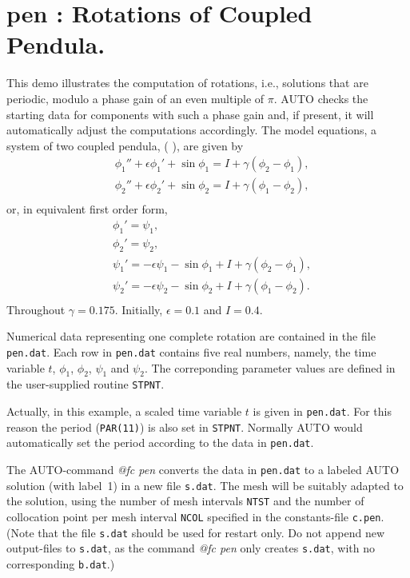 \documentclass[12pt]{report}
\def\eps{\epsilon}
\begin{document}
\section{ pen : Rotations of Coupled Pendula.} \label{sec:Demos_pen}
This demo illustrates the computation of rotations, i.e., solutions that
are periodic, modulo a phase gain of an even multiple of $\pi$.
{\cal AUTO} checks the starting data for components with such a phase gain
and, if present, it will automatically adjust the computations accordingly.
The model equations, a system of two coupled  pendula, 
( \citeyear{DoArOt:91}),
are given by
\begin{equation} \begin{array}{cl}
 & \phi_1'' + \eps \phi_1' + \sin \phi_1 
  = I + \gamma(\phi_2-\phi_1), \\
 & \phi_2'' + \eps \phi_2' + \sin \phi_2 
  = I + \gamma(\phi_1-\phi_2) ,\\
\end{array} \end{equation}
or, in equivalent first order form,
\begin{equation} \begin{array}{cl}
 & \phi_1'  =  \psi_1, \\
 & \phi_2'  =  \psi_2, \\
 & \psi_1'  = - \eps \psi_1 - \sin \phi_1 + I + \gamma(\phi_2-\phi_1), \\
 & \psi_2'  = - \eps \psi_2 - \sin \phi_2 + I + \gamma(\phi_1-\phi_2).\\
\end{array} \end{equation}
Throughout $\gamma=0.175$. Initially, $\eps=0.1$ and $I=0.4$.

Numerical data representing one complete rotation are
contained in the file {\tt pen.dat}. 
Each row in {\tt pen.dat} contains five real numbers, namely,
the time variable $t$, $\phi_1$, $\phi_2$, $\psi_1$ and $\psi_2$.
The correponding parameter values are defined in the user-supplied routine
{\tt STPNT}.

Actually, in this example, a scaled time variable $t$ is given in {\tt pen.dat}. 
For this reason the period ({\tt PAR(11)}) is also set in {\tt STPNT}.
Normally {\cal AUTO} would automatically set the period according to
the data in {\tt pen.dat}.

The {\cal AUTO}-command {\it @fc pen} converts the data in {\tt pen.dat}
to a labeled
{\cal AUTO} solution (with label~1) in a new file {\tt s.dat}.
The mesh will be suitably adapted to the solution, using the number of
mesh intervals {\tt NTST} and the number of collocation point per mesh
interval {\tt NCOL} specified in the constants-file {\tt c.pen}.
(Note that the file {\tt s.dat} should be used for restart only.
Do not append new output-files to {\tt s.dat}, as the command {\it @fc pen}
only creates {\tt s.dat}, with no corresponding {\tt b.dat}.)
\end{document}
